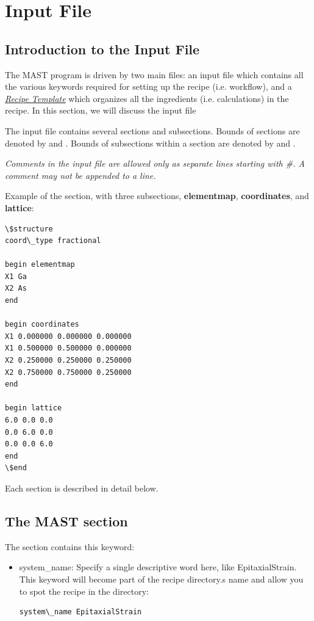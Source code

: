 \documentclass[letterpaper,10pt,english]{sphinxmanual}
\begin{document}
\chapter{Input File}
\label{3_0_inputfile::doc}\label{3_0_inputfile:input-file}

\section{Introduction to the Input File}
\label{3_0_inputfile:introduction-to-the-input-file}
The MAST program is driven by two main files: an input file which contains all the various keywords required for setting up the recipe (i.e. workflow), and a {\hyperref[4_0_recipe::doc]{\emph{Recipe Template}}} which organizes all the ingredients (i.e. calculations) in the recipe. In this section, we will discuss the input file

The input file contains several sections and subsections.
Bounds of sections are denoted by  and .
Bounds of subsections within a section are denoted by  and .

\emph{Comments in the input file are allowed only as separate lines starting with \#. A comment may not be appended to a line.}

Example of the  section, with three subsections, \textbf{elementmap}, \textbf{coordinates}, and \textbf{lattice}:

\begin{Verbatim}[commandchars=\\\{\}]
\$structure
coord\_type fractional

begin elementmap
X1 Ga
X2 As
end

begin coordinates
X1 0.000000 0.000000 0.000000
X1 0.500000 0.500000 0.000000
X2 0.250000 0.250000 0.250000
X2 0.750000 0.750000 0.250000
end

begin lattice
6.0 0.0 0.0
0.0 6.0 0.0
0.0 0.0 6.0
end
\$end
\end{Verbatim}

Each section is described in detail below.


\section{The MAST section}
\label{3_0_inputfile:the-mast-section}
The  section contains this keyword:
\begin{itemize}
\item {} 
system\_name: Specify a single descriptive word here, like EpitaxialStrain. This keyword will become part of the recipe directory.s name and allow you to spot the recipe in the  directory:

\begin{Verbatim}[commandchars=\\\{\}]
system\_name EpitaxialStrain
\end{Verbatim}

\end{itemize}
\end{document}
